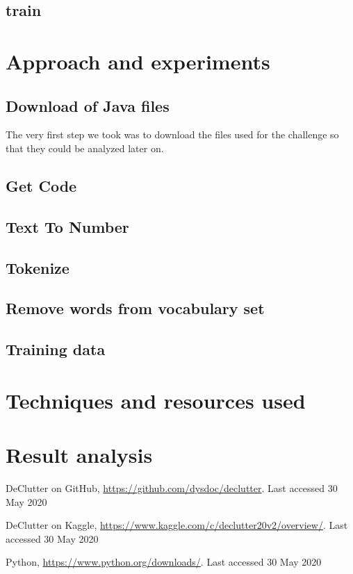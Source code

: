 \documentclass[runningheads]{llncs}
\begin{document}
\subsection{train}

\section{Approach and experiments}
\subsection{Download of Java files}
The very first step we took was to download the files used for the challenge so that they could be analyzed later on. 

\subsection{Get Code}

\subsection{Text To Number}

\subsection{Tokenize}

\subsection{Remove words from vocabulary set}

\subsection{Training data}

\section{Techniques and resources used}

\section{Result analysis}

%
%
%
% 
% 
%
\begin{thebibliography}{8}
DeClutter on GitHub, \url{https://github.com/dysdoc/declutter}. Last accessed 30 May 2020

DeClutter on Kaggle, \url{https://www.kaggle.com/c/declutter20v2/overview/}. Last accessed 30 May 2020

Python, \url{https://www.python.org/downloads/}. Last accessed 30 May 2020

\end{thebibliography}
\end{document}
